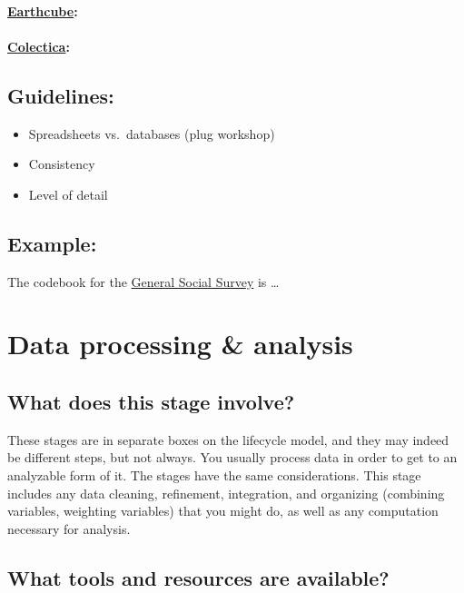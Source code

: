 \documentclass{tufte-handout}
\begin{document}
\paragraph{\href{http://earthcube.org/}{Earthcube}:}\label{earthcube}

\paragraph{\href{http://www.colectica.com/}{Colectica}:}\label{colectica}

\subsection{Guidelines:}\label{guidelines}

\begin{itemize}
\itemsep1pt\parskip0pt
\item
  Spreadsheets vs.~databases (plug workshop)
\item
  Consistency
\item
  Level of detail
\end{itemize}

\subsection{Example:}\label{example}

The codebook for the \href{http://www3.norc.org/GSS+Website/}{General
Social Survey} is \ldots{}

\section{Data processing \& analysis}\label{data-processing-analysis}

\subsection{What does this stage
involve?}\label{what-does-this-stage-involve-2}

These stages are in separate boxes on the lifecycle model, and they may
indeed be different steps, but not always. You usually process data in
order to get to an analyzable form of it. The stages have the same
considerations. This stage includes any data cleaning, refinement,
integration, and organizing (combining variables, weighting variables)
that you might do, as well as any computation necessary for analysis.

\subsection{What tools and resources are
available?}\label{what-tools-and-resources-are-available-2}
\end{document}
